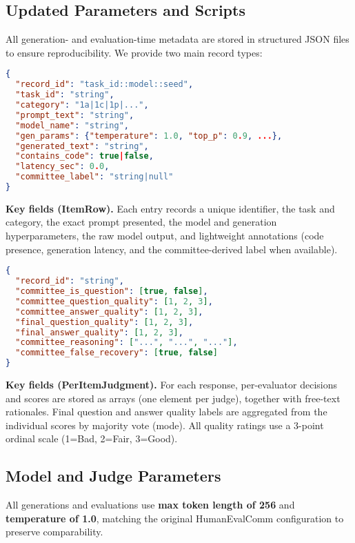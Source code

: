 \documentclass[acmsmall,screen,nonacm]{acmart}
\begin{document}
\subsection{Updated Parameters and Scripts}
\noindent All generation- and evaluation-time metadata are stored in structured JSON files to ensure reproducibility. We provide two main record types:

\begin{small}
\begin{lstlisting}[language=json,caption={Simplified per-response record (\texttt{ItemRow}).}]
{
  "record_id": "task_id::model::seed",
  "task_id": "string",
  "category": "1a|1c|1p|...",
  "prompt_text": "string",
  "model_name": "string",
  "gen_params": {"temperature": 1.0, "top_p": 0.9, ...},
  "generated_text": "string",
  "contains_code": true|false,
  "latency_sec": 0.0,
  "committee_label": "string|null"
}
\end{lstlisting}
\end{small}

\noindent\textbf{Key fields (ItemRow).}
Each entry records a unique identifier, the task and category, the exact prompt presented, the model and generation hyperparameters, the raw model output, and lightweight annotations (code presence, generation latency, and the committee-derived label when available).

\begin{small}
\begin{lstlisting}[language=json,caption={Simplified committee judgments (\texttt{PerItemJudgment}).}]
{
  "record_id": "string",
  "committee_is_question": [true, false],
  "committee_question_quality": [1, 2, 3],
  "committee_answer_quality": [1, 2, 3],
  "final_question_quality": [1, 2, 3],
  "final_answer_quality": [1, 2, 3], 
  "committee_reasoning": ["...", "...", "..."],
  "committee_false_recovery": [true, false]
}
\end{lstlisting}
\end{small}

\noindent\textbf{Key fields (PerItemJudgment).}
For each response, per-evaluator decisions and scores are stored as arrays (one element per judge), together with free-text rationales. Final question and answer quality labels are aggregated from the individual scores by majority vote (mode). All quality ratings use a 3-point ordinal scale (1=Bad, 2=Fair, 3=Good).

\subsection{Model and Judge Parameters}
All generations and evaluations use \textbf{max token length of 256} and \textbf{temperature of 1.0}, matching the original HumanEvalComm configuration to preserve comparability.
\end{document}
